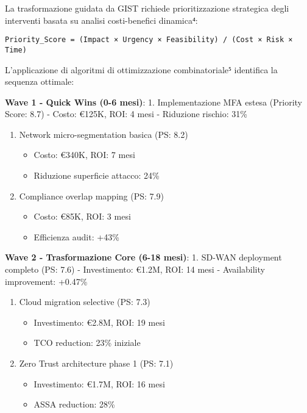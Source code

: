 \documentclass{report}
\begin{document}
La trasformazione guidata da GIST richiede prioritizzazione strategica
degli interventi basata su analisi costi-benefici dinamica⁴:

\begin{verbatim}
Priority_Score = (Impact × Urgency × Feasibility) / (Cost × Risk × Time)
\end{verbatim}

L'applicazione di algoritmi di ottimizzazione combinatoriale⁵ identifica
la sequenza ottimale:

\textbf{Wave 1 - Quick Wins (0-6 mesi)}: 1. Implementazione MFA estesa
(Priority Score: 8.7) - Costo: €125K, ROI: 4 mesi - Riduzione rischio:
31\%

\begin{enumerate}
\def\labelenumi{\arabic{enumi}.}
\setcounter{enumi}{1}
\tightlist
\item
  Network micro-segmentation basica (PS: 8.2)

  \begin{itemize}
  \tightlist
  \item
    Costo: €340K, ROI: 7 mesi
  \item
    Riduzione superficie attacco: 24\%
  \end{itemize}
\item
  Compliance overlap mapping (PS: 7.9)

  \begin{itemize}
  \tightlist
  \item
    Costo: €85K, ROI: 3 mesi
  \item
    Efficienza audit: +43\%
  \end{itemize}
\end{enumerate}

\textbf{Wave 2 - Trasformazione Core (6-18 mesi)}: 1. SD-WAN deployment
completo (PS: 7.6) - Investimento: €1.2M, ROI: 14 mesi - Availability
improvement: +0.47\%

\begin{enumerate}
\def\labelenumi{\arabic{enumi}.}
\setcounter{enumi}{1}
\tightlist
\item
  Cloud migration selective (PS: 7.3)

  \begin{itemize}
  \tightlist
  \item
    Investimento: €2.8M, ROI: 19 mesi
  \item
    TCO reduction: 23\% iniziale
  \end{itemize}
\item
  Zero Trust architecture phase 1 (PS: 7.1)

  \begin{itemize}
  \tightlist
  \item
    Investimento: €1.7M, ROI: 16 mesi
  \item
    ASSA reduction: 28\%
  \end{itemize}
\end{enumerate}
\end{document}
